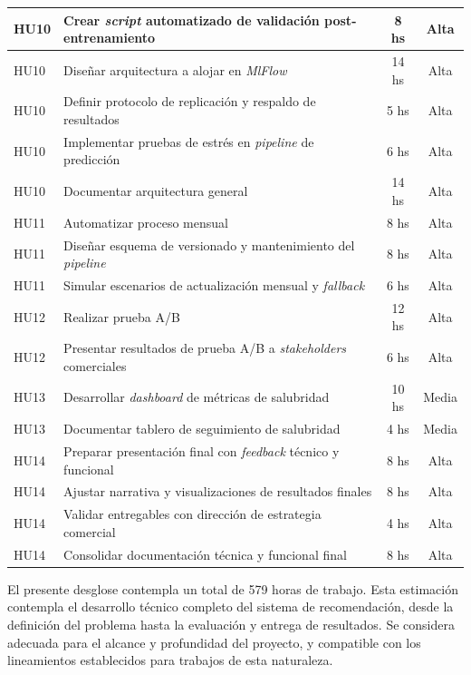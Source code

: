 \documentclass[
11pt, %
]{charter}
\begin{document}
\begin{longtable}{|p{2cm}|p{9cm}|c|c|}
HU10 & Crear \textit{script} automatizado de validación post-entrenamiento & 8 hs & Alta \\ \hline
HU10 & Diseñar arquitectura a alojar en \textit{MlFlow} & 14 hs & Alta \\ \hline
HU10 & Definir protocolo de replicación y respaldo de resultados & 5 hs & Alta \\ \hline
HU10 & Implementar pruebas de estrés en \textit{pipeline} de predicción & 6 hs & Alta \\ \hline
HU10 & Documentar arquitectura general & 14 hs & Alta \\ \hline

HU11 & Automatizar proceso mensual & 8 hs & Alta \\ \hline
HU11 & Diseñar esquema de versionado y mantenimiento del \textit{pipeline} & 8 hs & Alta \\ \hline
HU11 & Simular escenarios de actualización mensual y \textit{fallback} & 6 hs & Alta \\ \hline

HU12 & Realizar prueba A/B & 12 hs & Alta \\ \hline
HU12 & Presentar resultados de prueba A/B a \textit{stakeholders} comerciales & 6 hs & Alta \\ \hline

HU13 & Desarrollar \textit{dashboard} de métricas de salubridad & 10 hs & Media \\ \hline
HU13 & Documentar tablero de seguimiento de salubridad & 4 hs & Media \\ \hline

HU14 & Preparar presentación final con \textit{feedback} técnico y funcional & 8 hs & Alta \\ \hline
HU14 & Ajustar narrativa y visualizaciones de resultados finales & 8 hs & Alta \\ \hline
HU14 & Validar entregables con dirección de estrategia comercial & 4 hs & Alta \\ \hline
HU14 & Consolidar documentación técnica y funcional final & 8 hs & Alta \\ \hline

\end{longtable}

El presente desglose contempla un total de 579 horas de trabajo. Esta estimación contempla el desarrollo técnico completo del sistema de recomendación, desde la definición del problema hasta la evaluación y entrega de resultados. Se considera adecuada para el alcance y profundidad del proyecto, y compatible con los lineamientos establecidos para trabajos de esta naturaleza.
\end{document}
